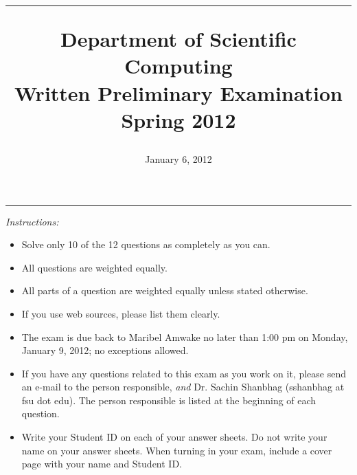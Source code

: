 \documentclass [11point]{article}
\begin{document}
\makeatletter	   %
\renewcommand{\ps@plain}{%
     \renewcommand{\@oddhead}{\textrm{\small {\it DSC Prelim Exam -- Spring 2012}}\hfil\textrm{\thepage}}%
     \renewcommand{\@evenhead}{\@oddhead}%
     \renewcommand{\@oddfoot}{}%
     \renewcommand{\@evenfoot}{\@oddfoot}}
\makeatother     %

\title{
\hrule 
\bigskip
Department of Scientific Computing\\
\textbf{Written Preliminary Examination} \\
Spring 2012 \\
}         %
\author{}        %
\date{January 6, 2012}          %
\maketitle

\pagestyle{plain}

\hrule 
\bigskip
\textit{Instructions:}

\bigskip

\begin{itemize}
\item Solve only 10 of the 12 questions as completely as you can. 

\item All questions are weighted equally.

\item All parts of a question are weighted equally unless stated otherwise.

\item If you use web sources, please list them clearly.

\item The exam is due back to Maribel Amwake no later than 1:00 pm on Monday, January 9, 2012; no exceptions allowed.

\item If you have any questions related to this exam as you work on it, please send an e-mail to the person responsible, \textit{and} Dr. Sachin Shanbhag (sshanbhag at fsu dot edu). The person responsible is listed at the beginning of each question.

\item Write your Student ID on each of your answer sheets. Do not write your name on your answer sheets. When turning in your exam, include a cover page with your name and Student ID.

\end{itemize}
\end{document}
